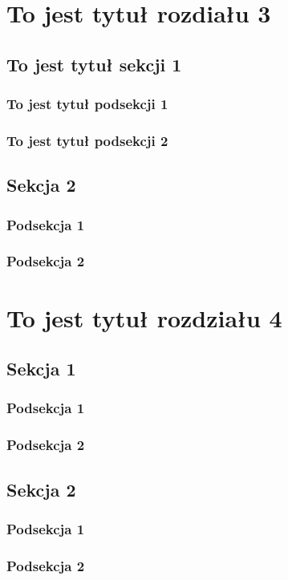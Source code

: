 \documentclass[a4paper, 12pt]{book}
\begin{document}
\chapter{To jest tytuł rozdiału 3}
\section{To jest tytuł sekcji 1}
\subsection{To jest tytuł podsekcji 1}
\subsection{To jest tytuł podsekcji 2}
\section{Sekcja 2}
\subsection{Podsekcja 1}
\subsection{Podsekcja 2}
\chapter{To jest tytuł rozdziału 4}
\section{Sekcja 1}
\subsection{Podsekcja 1}
\subsection{Podsekcja 2}
\section{Sekcja 2}
\subsection{Podsekcja 1}
\subsection{Podsekcja 2}
\end{document}
